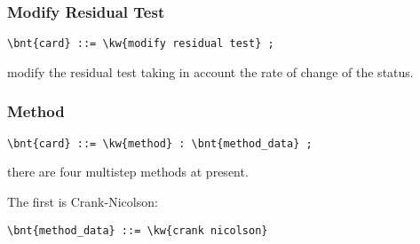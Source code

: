 
\subsubsection{Modify Residual Test}
\begin{Verbatim}[commandchars=\\\{\}]
    \bnt{card} ::= \kw{modify residual test} ;
\end{Verbatim}
modify the residual test taking in account the rate of change of the status.

\subsubsection{Method}
\begin{Verbatim}[commandchars=\\\{\}]
    \bnt{card} ::= \kw{method} : \bnt{method_data} ;
\end{Verbatim}
there are four multistep methods at present. 

The first is Crank-Nicolson:
\begin{Verbatim}[commandchars=\\\{\}]
    \bnt{method_data} ::= \kw{crank nicolson}
\end{Verbatim}

